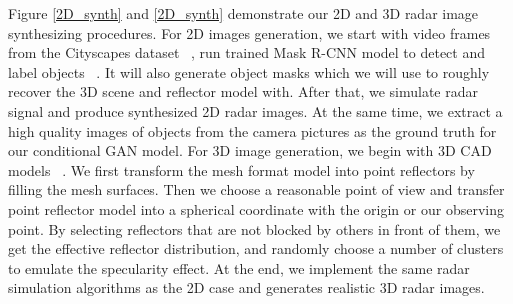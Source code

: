 Figure \ref{2D_synth} and \ref{2D_synth} demonstrate our 2D and 3D radar image synthesizing procedures. For 2D images generation, we start with video frames from the Cityscapes dataset ~\cite{cityscapes}, run trained Mask R-CNN model to detect and label objects ~\cite{rcnn}. It will also generate object masks which we will use to roughly recover the 3D scene and reflector model with. After that, we simulate radar signal and produce synthesized 2D radar images. At the same time, we extract a high quality images of objects from the camera pictures as the ground truth for our conditional GAN model.  For 3D image generation, we begin with 3D CAD models ~\cite{3Ddata}. We first transform the mesh format model into point reflectors by filling the mesh surfaces. Then we choose a reasonable point of view and transfer point reflector model into a spherical coordinate with the origin or our observing point. By selecting reflectors that are not blocked by others in front of them, we get the effective reflector distribution, and randomly choose a number of clusters to emulate the specularity effect. At the end, we implement the same radar simulation algorithms as the 2D case and generates realistic 3D radar images. 

